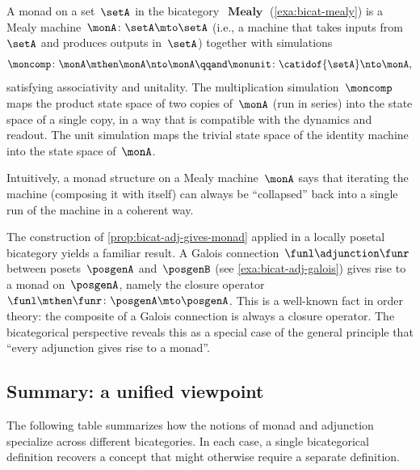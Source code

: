 \begin{example}
    \label{exa:bicat-monad-mealy}
    A monad on a set~$\setA$ in the bicategory~$\operatorname{\textbf{Mealy}}$ (\cref{exa:bicat-mealy}) is a Mealy machine~$\monA \colon \setA \mto \setA$ (i.e., a machine that takes inputs from~$\setA$ and produces outputs in~$\setA$) together with simulations
    \begin{equation}
        \moncomp \colon \monA \mthen \monA \nto \monA \qqand \monunit \colon \catidof{\setA} \nto \monA,
    \end{equation}
    satisfying associativity and unitality.
    The multiplication simulation~$\moncomp$ maps the product state space of two copies of~$\monA$ (run in series) into the state space of a single copy, in a way that is compatible with the dynamics and readout.
    The unit simulation maps the trivial state space of the identity machine into the state space of~$\monA$.

    Intuitively, a monad structure on a Mealy machine~$\monA$ says that iterating the machine (composing it with itself) can always be ``collapsed'' back into a single run of the machine in a coherent way.
\end{example}

\begin{example}
    \label{exa:bicat-monad-from-galois}
    The construction of \cref{prop:bicat-adj-gives-monad} applied in a locally posetal bicategory yields a familiar result.
    A Galois connection~$\funl \adjunction \funr$ between posets~$\posgenA$ and~$\posgenB$ (see \cref{exa:bicat-adj-galois}) gives rise to a monad on~$\posgenA$, namely the closure operator~$\funl \mthen \funr \colon \posgenA \mto \posgenA$.
    This is a well-known fact in order theory: the composite of a Galois connection is always a closure operator.
    The bicategorical perspective reveals this as a special case of the general principle that ``every adjunction gives rise to a monad''.
\end{example}

\subsection{Summary: a unified viewpoint}

The following table summarizes how the notions of monad and adjunction specialize across different bicategories.
In each case, a single bicategorical definition recovers a concept that might otherwise require a separate definition.

